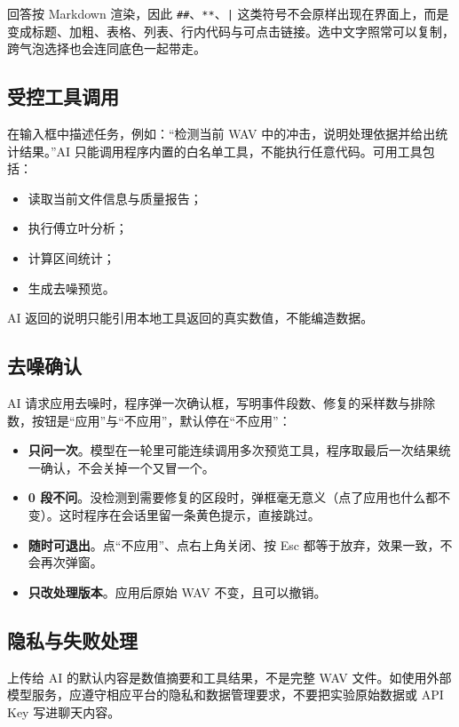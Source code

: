 \documentclass[UTF8,a4paper,12pt,scheme=chinese]{ctexart}
\begin{document}
回答按 Markdown 渲染，因此 \texttt{\#\#}、\texttt{**}、\texttt{|} 这类符号不会原样出现在界面上，而是变成标题、加粗、表格、列表、行内代码与可点击链接。选中文字照常可以复制，跨气泡选择也会连同底色一起带走。

\subsection{受控工具调用}

在输入框中描述任务，例如：“检测当前 WAV 中的冲击，说明处理依据并给出统计结果。”AI 只能调用程序内置的白名单工具，不能执行任意代码。可用工具包括：

\begin{itemize}
  \item 读取当前文件信息与质量报告；
  \item 执行傅立叶分析；
  \item 计算区间统计；
  \item 生成去噪预览。
\end{itemize}

AI 返回的说明只能引用本地工具返回的真实数值，不能编造数据。

\subsection{去噪确认}

AI 请求应用去噪时，程序弹一次确认框，写明事件段数、修复的采样数与排除数，按钮是“应用”与“不应用”，默认停在“不应用”：

\begin{itemize}
  \item \textbf{只问一次}。模型在一轮里可能连续调用多次预览工具，程序取最后一次结果统一确认，不会关掉一个又冒一个。
  \item \textbf{0 段不问}。没检测到需要修复的区段时，弹框毫无意义（点了应用也什么都不变）。这时程序在会话里留一条黄色提示，直接跳过。
  \item \textbf{随时可退出}。点“不应用”、点右上角关闭、按 Esc 都等于放弃，效果一致，不会再次弹窗。
  \item \textbf{只改处理版本}。应用后原始 WAV 不变，且可以撤销。
\end{itemize}

\subsection{隐私与失败处理}

上传给 AI 的默认内容是数值摘要和工具结果，不是完整 WAV 文件。如使用外部模型服务，应遵守相应平台的隐私和数据管理要求，不要把实验原始数据或 API Key 写进聊天内容。
\end{document}

